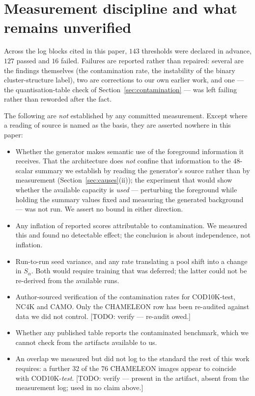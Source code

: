\documentclass{article}
\begin{document}
\section{Measurement discipline and what remains unverified}
\label{app:ledger}

Across the log blocks cited in this paper, $143$ thresholds were declared in
advance, $127$ passed and $16$ failed. Failures are reported rather than
repaired: several are the findings themselves (the contamination rate, the
instability of the binary cluster-structure label), two are corrections to our
own earlier work, and one --- the quantisation-table check of
Section~\ref{sec:contamination} --- was left failing rather than reworded after
the fact.

\noindent The following are \emph{not} established by any committed measurement.
Except where a reading of source is named as the basis, they are asserted
nowhere in this paper:
\begin{itemize}
\item Whether the generator makes semantic use of the foreground information it
      receives. That the architecture does \emph{not} confine that information
      to the $48$-scalar summary we establish by reading the generator's source
      rather than by measurement (Section~\ref{sec:causes}(ii)); the experiment
      that would show whether the available capacity is \emph{used} ---
      perturbing the foreground while holding the summary values fixed and
      measuring the generated background --- was not run. We assert no bound in
      either direction.
\item Any inflation of reported scores attributable to contamination. We
      measured this and found no detectable effect; the conclusion is about
      independence, not inflation.
\item Run-to-run seed variance, and any rate translating a pool shift into a
      change in $S_\alpha$. Both would require training that was deferred; the
      latter could not be re-derived from the available runs.
\item Author-sourced verification of the contamination rates for COD10K-test,
      NC4K and CAMO. Only the CHAMELEON row has been re-audited against data we
      did not control. [TODO: verify --- re-audit owed.]
\item Whether any published table reports the contaminated benchmark, which we
      cannot check from the artifacts available to us.
\item An overlap we measured but did not log to the standard the rest of this
      work requires: a further $32$ of the $76$ CHAMELEON images appear to
      coincide with COD10K-\emph{test}. [TODO: verify --- present in the
      artifact, absent from the measurement log; used in no claim above.]
\end{itemize}
\end{document}
